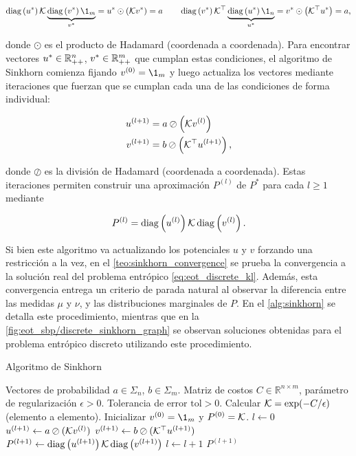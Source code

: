 \begin{equation*}
	\diag{u^*}\gibbs\underbrace{\diag{v^*} \1_m}_{v^*} = u^* \odot \parent{\gibbs v^*} = a
	\qquad
	\diag{v^*}\gibbs^\top\underbrace{\diag{u^*} \1_n}_{u^*} = v^* \odot \parent{\gibbs^\top u^*} = a ,
\end{equation*}

donde $\odot$ es el producto de Hadamard (coordenada a coordenada). Para encontrar vectores $u^*\in\mathbb{R}^n_{++}$, $v^*\in\mathbb{R}^m_{++}$ que cumplan estas condiciones, el algoritmo de Sinkhorn comienza fijando $v^{(0)}=\1_m$ y luego actualiza los vectores mediante iteraciones que fuerzan que se cumplan cada una de las condiciones de forma individual:

\begin{align}
	u^{(l+1)} &= a \oslash \left(\mathcal{K} v^{(l)}\right)\label{eq:sinkhorn_u_update}\\
	v^{(l+1)} &= b \oslash \left(\mathcal{K}^\top u^{(l+1)}\right)\label{eq:sinkhorn_v_update},
\end{align}

donde $\oslash$ es la división de Hadamard (coordenada a coordenada). Estas iteraciones permiten construir una aproximación $P^{(l)}$ de $P^*$ para cada $l\geq 1$ mediante

\begin{equation*}
	P^{(l)} = \operatorname{diag}\left(u^{(l)}\right)\mathcal{K}\operatorname{diag}\left(v^{(l)}\right).
\end{equation*}

Si bien este algoritmo va actualizando los potenciales $u$ y $v$ forzando una restricción a la vez, en el \autoref{teo:sinkhorn_convergence} se prueba la convergencia a la solución real del problema entrópico \eqref{eq:eot_discrete_kl}. Además, esta convergencia entrega un criterio de parada natural al observar la diferencia entre las medidas $\mu$ y $\nu$, y las distribuciones marginales de $P$. En el \autoref{alg:sinkhorn} se detalla este procedimiento, mientras que en la \autoref{fig:eot_sbp/discrete_sinkhorn_graph} se observan soluciones obtenidas para el problema entrópico discreto utilizando este procedimiento.

\begin{algorithm}
	\caption{Algoritmo de Sinkhorn}
   \label{alg:sinkhorn}
   \begin{algorithmic}[1]
   \Require Vectores de probabilidad $a\in\Sigma_n$, $b\in\Sigma_m$.
   \Require Matriz de costos $C\in\mathbb{R}^{n\times m}$, parámetro de regularización $\epsilon > 0$.
   \Require Tolerancia de error $\text{tol} > 0$.
   \State Calcular $\mathcal{K} = \exp(-C/\epsilon)$ (elemento a elemento).
   \State Inicializar $v^{(0)} = \1_m$ y $P^{(0)}=\mathcal{K}$.
   \State $l \gets 0$
	   \State $u^{(l+1)} \gets a \oslash (\mathcal{K} v^{(l)})$
	   \State $v^{(l+1)} \gets b \oslash (\mathcal{K}^\top u^{(l+1)})$
	   \State $P^{(l+1)} \gets \operatorname{diag}\left(u^{(l+1)}\right)\mathcal{K}\operatorname{diag}\left(v^{(l+1)}\right)$
	   \State $l \gets l + 1$
   \EndWhile
   \State \Return $P^{(l+1)}$
   \end{algorithmic}
   \end{algorithm}

